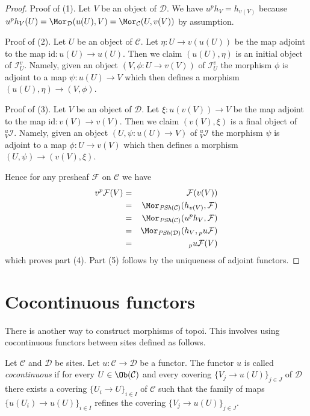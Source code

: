 \begin{proof}
Proof of (1). Let $V$ be an object of $\mathcal{D}$. We have
$u^ph_V = h_{v(V)}$ because
$u^ph_V(U) = \Mor_\mathcal{D}(u(U), V) = \Mor_\mathcal{C}(U, v(V))$
by assumption.

\medskip\noindent
Proof of (2). Let $U$ be an object of $\mathcal{C}$. Let
$\eta : U \to v(u(U))$ be the map adjoint to the map
$\text{id} : u(U) \to u(U)$. Then we claim $(u(U), \eta)$
is an initial object of $\mathcal{I}_U^v$. Namely, given
an object $(V, \phi : U \to v(V))$ of $\mathcal{I}_U^v$
the morphism $\phi$ is adjoint to a map $\psi : u(U) \to V$
which then defines a morphism $(u(U), \eta) \to (V, \phi)$.

\medskip\noindent
Proof of (3). Let $V$ be an object of $\mathcal{D}$. Let
$\xi : u(v(V)) \to V$ be the map adjoint to the map
$\text{id} : v(V) \to v(V)$. Then we claim $(v(V), \xi)$
is a final object of ${}_V^u\mathcal{I}$. Namely, given
an object $(U, \psi : u(U) \to V)$ of ${}_V^u\mathcal{I}$
the morphism $\psi$ is adjoint to a map $\phi : U \to v(V)$
which then defines a morphism $(U, \psi) \to (v(V), \xi)$.

\medskip\noindent
Hence for any presheaf $\mathcal{F}$ on $\mathcal{C}$ we have
\begin{eqnarray*}
v^p\mathcal{F}(V)
& = &
\mathcal{F}(v(V)) \\
& = &
\Mor_{\textit{PSh}(\mathcal{C})}(h_{v(V)}, \mathcal{F}) \\
& = &
\Mor_{\textit{PSh}(\mathcal{C})}(u^ph_V, \mathcal{F}) \\
& = &
\Mor_{\textit{PSh}(\mathcal{D})}(h_V, {}_pu\mathcal{F}) \\
& = &
{}_pu\mathcal{F}(V)
\end{eqnarray*}
which proves part (4). Part (5) follows by the uniqueness of adjoint functors.
\end{proof}




\section{Cocontinuous functors}
\label{section-cocontinuous-functors}

\noindent
There is another way to construct morphisms of topoi.
This involves using cocontinuous functors between sites defined as
follows.

\begin{definition}
\label{definition-cocontinuous}
Let $\mathcal{C}$ and $\mathcal{D}$ be sites.
Let $u : \mathcal{C} \to \mathcal{D}$ be a functor.
The functor $u$ is called {\it cocontinuous}
if for every $U \in \Ob(\mathcal{C})$
and every covering $\{V_j \to u(U)\}_{j \in J}$ of $\mathcal{D}$
there exists a covering
$\{U_i \to U\}_{i\in I}$ of $\mathcal{C}$
such that the family of maps $\{u(U_i) \to u(U)\}_{i \in I}$
refines the covering $\{V_j \to u(U)\}_{j \in J}$.
\end{definition}

